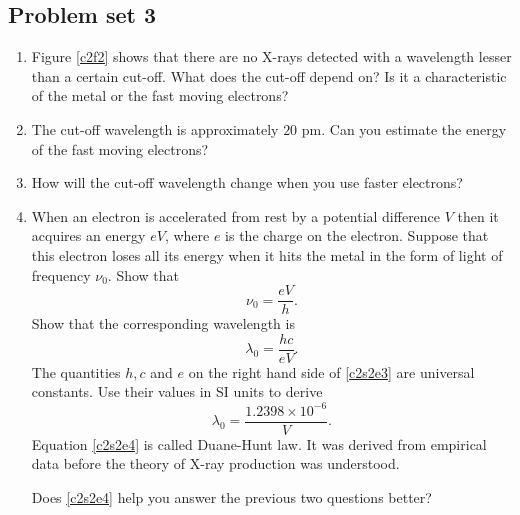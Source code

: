 \subsection{Problem set 3}
\begin{enumerate}
\item Figure \ref{c2f2} shows that there are no X-rays detected with a 
wavelength lesser than a certain cut-off. What does the cut-off depend on? Is 
it a characteristic of the metal or the fast moving electrons?
\item The cut-off wavelength is approximately $20$ pm. Can you estimate the 
energy of the fast moving electrons?
\item How will the cut-off wavelength change when you use faster electrons?
\item When an electron is accelerated from rest by a potential difference 
$V$ then it acquires an energy $eV$, where $e$ is the charge on the electron.
Suppose that this electron loses all its energy when it hits the metal in the
form of light of frequency $\nu_0$. Show that
\begin{equation}\label{c2s2e2}
\nu_0 = \frac{eV}{h}.
\end{equation}
Show that the corresponding wavelength is
\begin{equation}\label{c2s2e3}
\lambda_0 = \frac{hc}{eV}.
\end{equation}
The quantities $h, c$ and $e$ on the right hand side of \eqref{c2s2e3} are 
universal constants. Use their values in SI units to derive
\begin{equation}\label{c2s2e4}
\lambda_0 = \frac{1.2398 \times 10^{-6}}{V}.
\end{equation}
Equation \eqref{c2s2e4} is called Duane-Hunt law. It was derived from empirical
data before the theory of X-ray production was understood.

Does \eqref{c2s2e4} help you answer the previous two questions better?
\end{enumerate}

